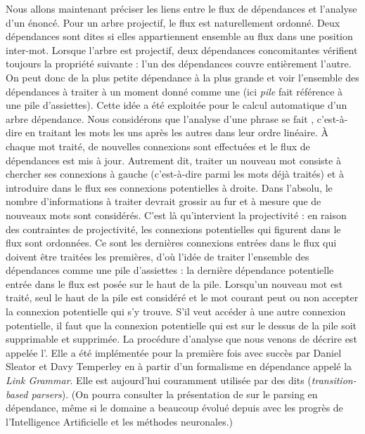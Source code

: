 {    Nous allons maintenant préciser les liens entre le flux de dépendances et l’analyse d’un énoncé. Pour un arbre projectif, le flux est naturellement ordonné. Deux dépendances sont dites  si elles appartiennent ensemble au flux dans une position inter-mot. Lorsque l’arbre est projectif, deux dépendances concomitantes vérifient toujours la propriété suivante : l’un des dépendances couvre entièrement l’autre. On peut donc  de la plus petite dépendance à la plus grande et voir l’ensemble des dépendances à traiter à un moment donné comme une  (ici \textit{pile} fait référence à une pile d’assiettes). Cette idée a été exploitée pour le calcul automatique d’un arbre dépendance. Nous considérons que l’analyse d’une phrase se fait , c’est-à-dire en traitant les mots les uns après les autres dans leur ordre linéaire. À chaque mot traité, de nouvelles connexions sont effectuées et le flux de dépendances est mis à jour. Autrement dit, traiter un nouveau mot consiste à chercher ses connexions à gauche (c’est-à-dire parmi les mots déjà traités) et à introduire dans le flux ses connexions potentielles à droite. Dans l’absolu, le nombre d’informations à traiter devrait grossir au fur et à mesure que de nouveaux mots sont considérés. C’est là qu’intervient la projectivité : en raison des contraintes de projectivité, les connexions potentielles qui figurent dans le flux sont ordonnées. Ce sont les dernières connexions entrées dans le flux qui doivent être traitées les premières, d’où l’idée de traiter l’ensemble des dépendances comme une pile d’assiettes : la dernière dépendance potentielle entrée dans le flux est posée sur le haut de la pile. Lorsqu’un nouveau mot est traité, seul le haut de la pile est considéré et le mot courant peut ou non accepter la connexion potentielle qui s’y trouve. S’il veut accéder à une autre connexion potentielle, il faut que la connexion potentielle qui est sur le dessus de la pile soit supprimable et supprimée. La procédure d’analyse que nous venons de décrire est appelée l’. Elle a été implémentée pour la première fois avec succès par Daniel Sleator et Davy Temperley en \citeyear{sleator1993parsing} à partir d'un formalisme en dépendance appelé la \textit{Link Grammar}. Elle est aujourd'hui couramment utilisée par des  dits  (\textit{transition-based parsers}). (On pourra consulter la présentation de \citet{kubler2009dependency} sur le parsing en dépendance, même si le domaine a beaucoup évolué depuis avec les progrès de l'Intelligence Artificielle et les méthodes neuronales.)

}
